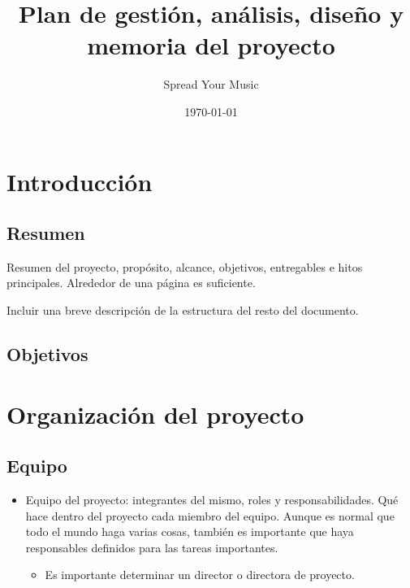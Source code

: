 \documentclass[12pt]{article}%
\begin{document}
\title{Plan de gesti\'on, an\'alisis, dise\~no y memoria del proyecto}
\author{Spread Your Music}
\date{\today}
\maketitle

\tableofcontents

\newpage


\section{Introducci\'on}

\subsection{Resumen}

Resumen del proyecto, prop\'osito, alcance, objetivos, entregables e hitos principales. Alrededor de una p\'agina es suficiente.

Incluir una breve descripci\'on de la estructura del resto del documento.

\subsection{Objetivos}


\section{Organizaci\'on del proyecto} %
\subsection{Equipo}

\begin{itemize}
	\item Equipo del proyecto: integrantes del mismo, roles y responsabilidades. Qu\'e hace dentro del proyecto cada miembro del equipo. Aunque es normal que todo el mundo haga varias cosas, tambi\'en es importante que haya responsables definidos para las tareas importantes.
	
	\begin{itemize}
		\item Es importante determinar un director o directora de proyecto.
	\end{itemize}
\end{itemize}
\end{document}
